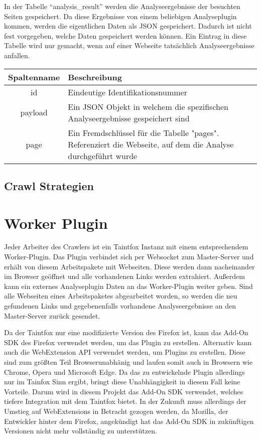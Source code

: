 In der Tabelle "`analysis\_result"' werden die Analyseergebnisse der besuchten Seiten gespeichert. Da diese Ergebnisse von einem beliebigen Analyseplugin kommen, werden die eigentlichen Daten als JSON gespeichert. Dadurch ist nicht fest vorgegeben, welche Daten gespeichert werden können. Ein Eintrag in diese Tabelle wird nur gemacht, wenn auf einer Webseite tatsächlich Analyseergebnisse anfallen.

\begin{tabular}{c|p{10.5cm}}
	Spaltenname & Beschreibung  \\ 
	\hline\hline
	id & Eindeutige Identifikationsnummer \\ 
	\hline 
	payload & Ein JSON Objekt in welchem die spezifischen Analyseergebnisse gespeichert sind \\
	\hline 
	page & Ein Fremdschlüssel für die Tabelle "pages". Referenziert die Webseite, auf dem die Analyse durchgeführt wurde  \\
\end{tabular} 

\subsection{Crawl Strategien}
\section{Worker Plugin}
Jeder Arbeiter des Crawlers ist ein Taintfox Instanz mit einem entsprechendem Worker-Plugin. Das Plugin verbindet sich per Websocket zum Master-Server und erhält von diesem Arbeitspakete mit Webseiten. Diese werden dann nacheinander im Browser geöffnet und alle vorhandenen Links werden extrahiert. Außerdem kann ein externes Analyseplugin Daten an das Worker-Plugin weiter geben. Sind alle Webseiten eines Arbeitspaketes abgearbeitet worden, so werden die neu gefundenen Links und gegebenenfalls vorhandene Analyseergebnisse an den Master-Server zurück gesendet.

Da der Taintfox nur eine modifizierte Version des Firefox ist, kann das Add-On SDK des Firefox verwendet werden, um das Plugin zu erstellen. Alternativ kann auch die WebExtension API verwendet werden, um Plugins zu erstellen. Diese sind zum größten Teil Browserunabhänig und laufen somit auch in Browsern wie Chrome, Opera und Microsoft Edge. Da das zu entwickelnde Plugin allerdings nur im Tainfox Sinn ergibt, bringt diese Unabhängigkeit in diesem Fall keine Vorteile. Darum wird in diesem Projekt das Add-On SDK verwendet, welches tiefere Integration mit dem Taintfox bietet. In der Zukunft muss allerdings der Umstieg auf WebExtensions in Betracht gezogen werden, da Mozilla, der Entwickler hinter dem Firefox, angekündigt hat das Add-On SDK in zukünftigen Versionen nicht mehr vollständig zu unterstützen.

